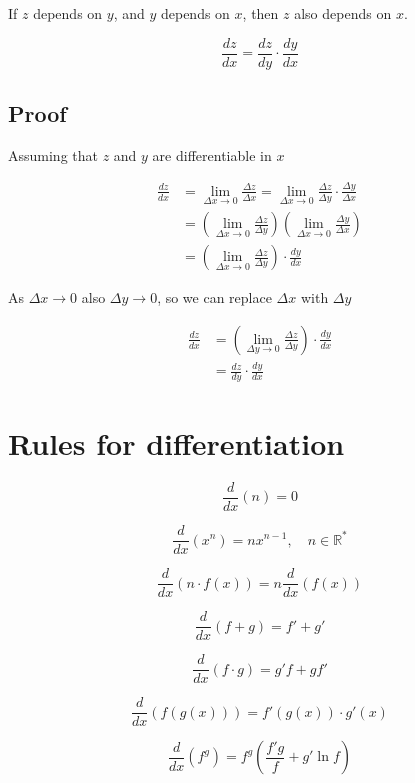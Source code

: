 \documentclass{article}
\begin{document}
If \(z\) depends on \(y\), and \(y\) depends on \(x\), then \(z\) also depends on \(x\).

\[
    \frac{dz}{dx}=\frac{dz}{dy}\cdot\frac{dy}{dx}
\]

\subsection{Proof}

Assuming that \(z\) and \(y\) are differentiable in \(x\)

\begin{align*}
    \frac{dz}{dx}
    &= \lim_{\Delta x \to 0} \frac{\Delta z}{\Delta x}
    = \lim_{\Delta x \to 0} \frac{\Delta z}{\Delta y} \cdot \frac{\Delta y}{\Delta x} \\
    &= \left(
        \lim_{\Delta x \to 0} \frac{\Delta z}{\Delta y}
    \right)
    \left(
        \lim_{\Delta x \to 0} \frac{\Delta y}{\Delta x}
    \right) \\
    &= \left(
        \lim_{\Delta x \to 0} \frac{\Delta z}{\Delta y}
    \right)
    \cdot
    \frac{dy}{dx}
\end{align*}

As \(\Delta x \to 0\) also \(\Delta y \to 0\), so we can replace \(\Delta x\) with \(\Delta y\)

\begin{align*}
    \frac{dz}{dx}
    &= \left(
        \lim_{\Delta y \to 0} \frac{\Delta z}{\Delta y}
    \right)
    \cdot
    \frac{dy}{dx} \\
    &= \frac{dz}{dy} \cdot \frac{dy}{dx}
\end{align*}

\pagebreak

\section{Rules for differentiation}

\[
    \frac{d}{dx}(n)=0
\]

\[
    \frac{d}{dx}(x^n)=nx^{n-1},\quad n\in\mathbb{R}^*
\]

\[
    \frac{d}{dx}\left(n\cdot f(x)\right)=n\frac{d}{dx}\left(f(x)\right)
\]

\[
    \frac{d}{dx}(f+g)=f'+g'
\]

\[
    \frac{d}{dx}(f\cdot g)=g'f+gf'
\]

\[
    \frac{d}{dx}(f(g(x)))=f'(g(x))\cdot g'(x)
\]

\[
    \frac{d}{dx}(f^g)=f^g\left(\frac{f'g}{f}+g'\ln f\right)
\]
\end{document}
